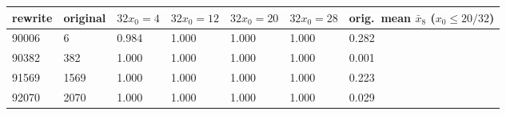 \begin{tabular}{lllllll}
\toprule
rewrite & original & $32x_0=4$ & $32x_0=12$ & $32x_0=20$ & $32x_0=28$ & orig.\ mean $\bar x_8$ ($x_0\le 20/32$) \\
\midrule
90006 & 6 & 0.984 & 1.000 & 1.000 & 1.000 & 0.282 \\
90382 & 382 & 1.000 & 1.000 & 1.000 & 1.000 & 0.001 \\
91569 & 1569 & 1.000 & 1.000 & 1.000 & 1.000 & 0.223 \\
92070 & 2070 & 1.000 & 1.000 & 1.000 & 1.000 & 0.029 \\
\bottomrule
\end{tabular}